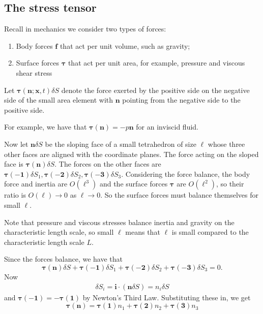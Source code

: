 \documentclass{article}
\begin{document}
\subsection{The stress tensor}
Recall in mechanics we consider two types of forces:
\begin{enumerate}
	\item Body forces $ \mathbf f $ that act per unit volume, such as gravity;
	\item Surface forces $ \boldsymbol \tau $ that act per unit area, for example, pressure and viscous shear stress
\end{enumerate}
Let $ \boldsymbol\tau (\mathbf n; \mathbf x, t) \delta S $ denote the force exerted by the positive side on the negative side of the small area element with $ \mathbf n $ pointing from the negative side to the positive side. \par
For example, we have that $ \boldsymbol\tau(\mathbf n) = - p\mathbf n $ for an inviscid fluid. \par
Now let $ \mathbf n \delta S $ be the sloping face of a small tetrahedron of size $ \ell $ whose three other faces are aligned with the coordinate planes. The force acting on the sloped face is $ \boldsymbol \tau(\mathbf n)\delta S $. The forces on the other faces are $ \boldsymbol\tau(-\mathbf 1)\delta S_1, \boldsymbol\tau(-\mathbf 2)\delta S_2, \boldsymbol\tau(-\mathbf 3)\delta S_3 $. Considering the force balance, the body force and inertia are $ O(\ell^3) $ and the surface forces $ \boldsymbol \tau $ are $ O(\ell^2) $, so their ratio is $ O(\ell)\to 0 $ as $ \ell \to 0 $. So the surface forces must balance themselves for small $ \ell $.\par
Note that pressure and viscous stresses balance inertia and gravity on the characteristic length scale, so small $ \ell $ means that $ \ell $ is small compared to the characteristic length scale $ L $.\par
Since the forces balance, we have that
\[
  \boldsymbol\tau(\mathbf n ) \delta S + \boldsymbol \tau(-\mathbf 1)\delta S_1 + \boldsymbol\tau (-\mathbf 2)\delta S_2 + \boldsymbol\tau(-\mathbf 3)\delta S_3 = 0.
\]
Now
\begin{align*}
  \delta S_i = \mathbf i \cdot (\mathbf n \delta S) = n_i \delta S
\end{align*}
and $ \boldsymbol \tau(-\mathbf 1) = - \boldsymbol \tau(\mathbf 1) $ by Newton's Third Law. Substituting these in, we get
\[
  \boldsymbol \tau(\mathbf n) = \boldsymbol \tau (\mathbf 1) n_1 + \boldsymbol \tau(\mathbf 2) n_2 + \boldsymbol \tau(\mathbf 3) n_3
\]
\end{document}
